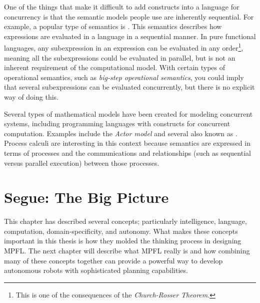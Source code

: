 One of the things that make it difficult to add constructs into a language for concurrency is that the semantic models people use are inherently sequential. For example, a popular type of semantics is . This semantics describes how expressions are evaluated in a language in a sequential manner. In pure functional languages, any subexpression in an expression can be evaluated in any order\footnote{This is one of the consequences of the \textit{Church-Rosser Theorem}.}, meaning all the subexpressions could be evaluated in parallel, but is not an inherent requirement of the computational model. With certain types of operational semantics, such as \textit{big-step operational semantics}, you could imply that several subexpressions can be evaluated concurrently, but there is no explicit way of doing this.

Several types of mathematical models have been created for modeling concurrent systems, including programming languages with constructs for concurrent computation. Examples include the \textit{Actor model} and several  also known as  \citep{baeten:historyofprocessalg}. Process calculi are interesting in this context because semantics are expressed in terms of processes and the communications and relationships (such as sequential versus parallel execution) between those processes.

\section{Segue: The Big Picture}
This chapter has described several concepts; particularly intelligence, language, computation, domain-specificity, and autonomy. What makes these concepts important in this thesis is how they molded the thinking process in designing MPFL. The next chapter will describe what MPFL really is and how combining many of these concepts together can provide a powerful way to develop autonomous robots with sophisticated planning capabilities.

